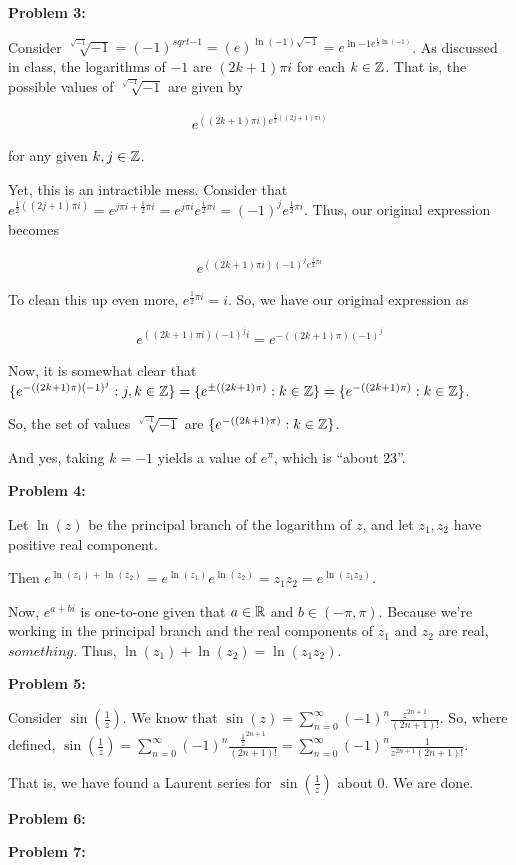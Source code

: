 \documentclass[a4paper,12pt]{article}
\begin{document}
\shunt

{\bf Problem 3:}

Consider $\sqrt[\sqrt{-1}]{-1} = (-1)^{sqrt{-1}} = (e)^{\ln(-1)\sqrt{-1}} = e^{\ln{-1}e^{\frac{1}{2}\ln(-1)}}$. As discussed in class, the logarithms of $-1$ are $(2k+1)\pi i$ for each $k \in \mathbb{Z}$. That is, the possible values of $\sqrt[\sqrt{-1}]{-1}$ are given by 

\begin{align*}
e^{((2k+1)\pi i)e^{\frac{1}{2}((2j+1)\pi i)}} 
\end{align*} %

for any given $k, j \in \mathbb{Z}$.

Yet, this is an intractible mess. Consider that $e^{\frac{1}{2}((2j+1)\pi i)} = e^{j \pi i + \frac{1}{2} \pi i} = e^{j\pi i} e^{\frac{1}{2} \pi i} = (-1)^j e^{\frac{1}{2} \pi i}$. Thus, our original expression becomes

\begin{align*}
e^{((2k+1)\pi i)(-1)^j e^{\frac{1}{2} \pi i}} 
\end{align*}

To clean this up even more, $e^{\frac{1}{2} \pi i}=i$. So, we have our original expression as 

\begin{align*}
e^{((2k+1)\pi i)(-1)^j i}  = e^{-((2k+1)\pi)(-1)^j}
\end{align*}

Now, it is somewhat clear that $\{e^{-((2k+1)\pi)(-1)^j}: j, k \in \mathbb{Z} \} = \{ e^{ \pm ((2k+1)\pi)}: k \in \mathbb{Z} \} = \{e^{-((2k+1)\pi)}: k \in \mathbb{Z} \}$.

So, the set of values $\sqrt[\sqrt{-1}]{-1}$ are $\{e^{-((2k+1)\pi)}: k \in \mathbb{Z} \}$. 

And yes, taking $k=-1$ yields a value of $e^\pi$, which is ``about $23$''.

\shunt

{\bf Problem 4:}

Let $\ln(z)$ be the principal branch of the logarithm of $z$, and let $z_1, z_2$ have positive real component.

Then $e^{\ln(z_1)+\ln(z_2)} = e^{\ln(z_1)}e^{\ln(z_2)} = z_1z_2 = e^{\ln(z_1z_2)}$.

Now, $e^{a+bi}$ is one-to-one given that $a \in \mathbb{R}$ and $b \in (-\pi,\pi)$. Because we're working in the principal branch and the real components of $z_1$ and $z_2$ are real, $something$. Thus, $\ln(z_1)+\ln(z_2) = \ln(z_1z_2)$. %

\shunt

{\bf Problem 5:}

Consider $\sin(\frac{1}{z})$. We know that $\sin(z) = \sum\limits_{n=0}^\infty (-1)^n \frac{z^{2n+1}}{(2n+1)!}$. So, where defined, $\sin(\frac{1}{z}) = \sum\limits_{n=0}^\infty (-1)^n \frac{\frac{1}{z}^{2n+1}}{(2n+1)!} = \sum\limits_{n=0}^\infty (-1)^n \frac{1}{z^{2n+1}(2n+1)!}$.

That is, we have found a Laurent series for $\sin(\frac{1}{z})$ about $0$. We are done.

\shunt

{\bf Problem 6:}

\shunt

{\bf Problem 7:}

\shunt
\end{document}
